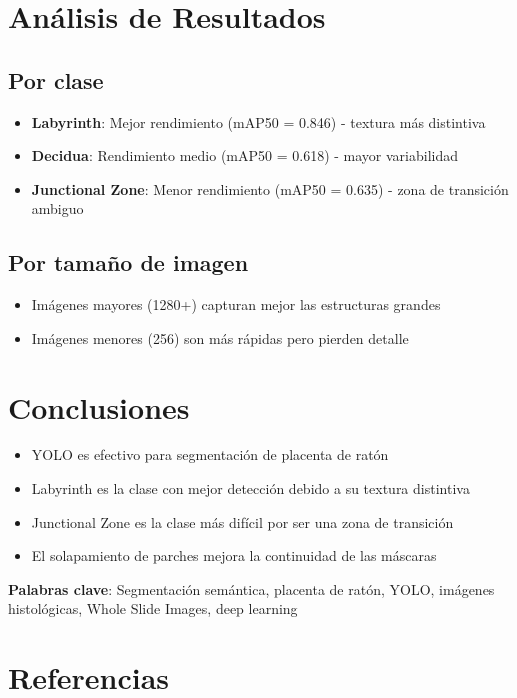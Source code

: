 \documentclass[12pt,a4paper]{article}
\begin{document}
\section{Análisis de Resultados}

\subsection{Por clase}
\begin{itemize}
    \item \textbf{Labyrinth}: Mejor rendimiento (mAP50 = 0.846) - textura más distintiva
    \item \textbf{Decidua}: Rendimiento medio (mAP50 = 0.618) - mayor variabilidad
    \item \textbf{Junctional Zone}: Menor rendimiento (mAP50 = 0.635) - zona de transición ambiguo
\end{itemize}

\subsection{Por tamaño de imagen}
\begin{itemize}
    \item Imágenes mayores (1280+) capturan mejor las estructuras grandes
    \item Imágenes menores (256) son más rápidas pero pierden detalle
\end{itemize}

\section{Conclusiones}

\begin{itemize}
    \item YOLO es efectivo para segmentación de placenta de ratón
    \item Labyrinth es la clase con mejor detección debido a su textura distintiva
    \item Junctional Zone es la clase más difícil por ser una zona de transición
    \item El solapamiento de parches mejora la continuidad de las máscaras
\end{itemize}

\textbf{Palabras clave}: Segmentación semántica, placenta de ratón, YOLO, imágenes histológicas, Whole Slide Images, deep learning

\section{Referencias}
\end{document}
